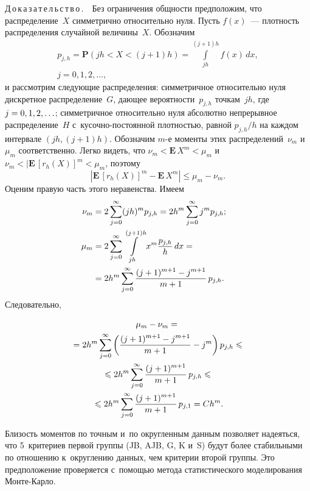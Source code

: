 \begin{multicols}{2}
\noindent
Д\,о\,к\,а\,з\,а\,т\,е\,л\,ь\,с\,т\,в\,о\,.\ \ 
Без ограничения общности предположим, что распределение~$X$ симметрично относительно нуля. Пусть $f(x)$~---
плот\-ность распределения случайной величины~$X$. Обозначим
\begin{multline*}
p_{j,h}=\mathbf{P}\left(jh<X<(j+1)h\right)=\int\limits_{jh}^{(j+1)h}f(x)\,dx,\\
 j=0,1, 2,\ldots,
\end{multline*}
и рассмотрим следующие распределения: сим\-мет\-рич\-ное относительно нуля дис\-крет\-ное рас\-пре\-де\-ле\-ние~$G$,
да\-ющее вероятности~$p_{j,h}$ точкам~$jh$, где $j\hm=0,1,2,\ldots$; симметричное относительно нуля абсолютно
непрерывное распределение~$H$ с~ку\-соч\-но-по\-сто\-ян\-ной плот\-ностью, равной $p_{j,h}/h$ на каж\-дом интервале
$(jh,(j+1)h)$. Обозначим $m$-е моменты этих распределений~$\nu_m$ и~$\mu_m$ соответственно. Лег\-ко видеть,
что
$\nu_m<\mathbf{E}\, X^m<\mu_m$ и~$\nu_m<|\mathbf{E}\,[r_h(X)]^m<\mu_m$,
поэтому
$$
\left\vert \mathbf{E}\,\left[r_h(X)\right]^m-\mathbf{E}\, X^m \right\vert \leqslant\mu_m-\nu_m.
$$
Оценим правую часть этого неравенства. Имеем
\begin{align*}
\nu_m&=2\sum\limits_{j=0}^\infty(jh)^mp_{j,h}=2h^m\sum\limits_{j=0}^\infty j^mp_{j,h};
\\
\mu_m&=2\sum\limits_{j=0}^\infty\int\limits_{jh}^{(j+1)h}x^m
\displaystyle\frac{\displaystyle p_{j,h}\mathstrut}{\displaystyle h\mathstrut}\,dx={}&\\
&{}=
2h^m\sum\limits_{j=0}^\infty\displaystyle\frac{\displaystyle (j+1)^{m+1}-j^{m+1}\mathstrut}{\displaystyle m+1\mathstrut}\,p_{j,h}.
\end{align*}
Следовательно,

\vspace*{-6pt}

\noindent
\begin{multline*}
\mu_m-\nu_m={}\\
{}=2h^m\sum\limits_{j=0}^\infty\left(\displaystyle\frac{\displaystyle (j+1)^{m+1}-j^{m+1}\mathstrut}{\displaystyle m+1\mathstrut}-j^m\right)p_{j,h}
\leqslant{}\\
{}\leqslant
2h^m\sum\limits_{j=0}^\infty\displaystyle\frac{\displaystyle (j+1)^{m+1}\mathstrut}{\displaystyle m+1\mathstrut}\,p_{j,h}
\leqslant{}\\
{}\leqslant 2h^m\sum\limits_{j=0}^\infty\displaystyle\frac{\displaystyle (j+1)^{m+1}\mathstrut}{\displaystyle m+1\mathstrut}\,p_{j,1}=Ch^m.
\end{multline*}


\vspace*{-4pt}

Близость моментов по точным и~по округленным данным позволяет надеяться, что 5~критериев первой группы
(JB, AJB, G, K и~S) будут более стабильными по отношению к~округлению данных, чем критерии второй группы.
Это предположение проверяется с~по\-мощью метода статистического моделирования Мон\-те-Карло.


\end{multicols}
